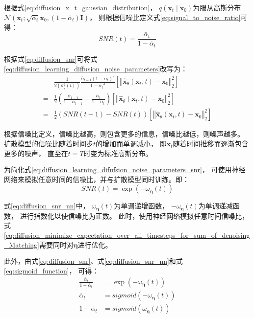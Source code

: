 根据式{\ref{eq:diffusion_x_t_gaussian_distribution}}，
{$q(\bm{x}_{t}\mid \bm{x}_{0})$}为服从高斯分布{$\mathcal{N}(\bm{x}_{t}; \sqrt{\bar{\alpha}_{t}}\bm{x}_{0},(1- \bar{\alpha}_{t})\bm{I})$}，
则根据信噪比定义式{\ref{eq:signal_to_noise_ratio}}可得：
\begin{equation}
    \label{eq:diffusion_snr}
    SNR(t)=\frac{\bar{\alpha}_{t}}{1-\bar{\alpha}_{t}}
\end{equation}

根据式{\ref{eq:diffusion_snr}}可将式{\ref{eq:diffusion_learning_diffusion_noise_parameters}}改写为：
\begin{align}
    &\frac{1}{2(\sigma_{q}^{2}(t))}
    \frac{\bar{\alpha}_{t-1}{(1-\alpha_{t})}^{2}}{{ 1-\bar{\alpha}_{t}}^{2}}\left[ {\left\Vert
    \hat{\bm{x}}_{\theta}(\bm{x}_{t}, t)-\bm{x}_{0}
    \right\Vert}_{2}^{2}\right]
    \\ = &  \frac{1}{2}\left(
        \frac{\bar{\alpha}_{t-1}}{1-\bar{\alpha}_{t-1}}
        -\frac{\bar{\alpha}_{t}}{1-\bar{\alpha}_{t}}
    \right)
    \left[ {\left\Vert
    \hat{\bm{x}}_{\theta}(\bm{x}_{t}, t)-\bm{x}_{0}
    \right\Vert}_{2}^{2}\right] 
    \\ = &  \frac{1}{2}\left(
        SNR(t-1)-SNR(t)
    \right)
    \left[ {\left\Vert
    \hat{\bm{x}}_{\theta}(\bm{x}_{t}, t)-\bm{x}_{0}
    \right\Vert}_{2}^{2}\right] \label{eq:diffusion_learning_difufsion_noise_parameters_snr}
\end{align}

根据信噪比定义，信噪比越高，则包含更多的信息，信噪比越低，则噪声越多。
扩散模型的信噪比随着时间步{$t$}的增加而单调减小，
即{$\bm{x}_{t}$}随着时间推移而逐渐包含更多的噪声，
直至在{$t=T$}时变为标准高斯分布。

为简化式{\ref{eq:diffusion_learning_difufsion_noise_parameters_snr}}，
可使用神经网络来模拟任意时间的信噪比，并与扩散模型同时训练。即：
\begin{equation}
    \label{eq:diffusion_snr_nn}
    SNR(t)=\exp(-\omega_{\bm{\eta}}(t))
\end{equation}

式{\ref{eq:diffusion_snr_nn}}中，
{$\omega_{\bm{\eta}}(t)$}为单调递增函数，
{$-\omega_{\bm{\eta}}(t)$}为单调递减函数，
进行指数化以使信噪比为正数。
此时，使用神经网络模拟任意时间信噪比，式{\ref{eq:diffusion_minimize_expectation_over_all_timesteps_for_sum_of_denoising_Matching}}需要同时对{$\bm{\eta}$}进行优化。

此外，由式{\ref{eq:diffusion_snr}}、式{\ref{eq:diffusion_snr_nn}}和式{\ref{eq:sigmoid_function}}，
可得：
\begin{align}
    \frac{\bar{\alpha}_{t}}{1-\bar{\alpha}_{t}} & =\exp(-\omega_{\bm{\eta}}(t)) \\
    \bar{\alpha}_{t} & = sigmoid(-\omega_{\bm{\eta}}(t)) \label{eq:diffusion_bar_alpha_t}\\
    1-\bar{\alpha}_{t} & = sigmoid(\omega_{\bm{\eta}}(t)) \label{eq:diffusion_bar_1_minux_bar_alpha_t}
\end{align}

